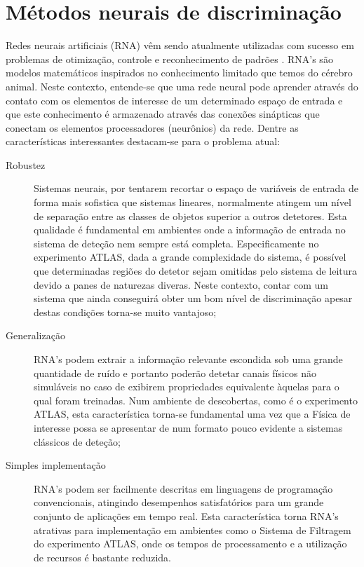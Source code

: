 \section{Métodos neurais de discriminação}
\label{sec:neural}

Redes neurais artificiais (RNA) vêm sendo atualmente utilizadas com sucesso em
problemas de otimização, controle e reconhecimento de padrões
\cite{haykin}. RNA's são modelos matemáticos inspirados no conhecimento
limitado que temos do cérebro animal. Neste contexto, entende-se que uma rede
neural pode aprender através do contato com os elementos de interesse de um
determinado espaço de entrada e que este conhecimento é armazenado através das
conexões sinápticas que conectam os elementos processadores (neurônios) da
rede. Dentre as características interessantes destacam-se para o problema
atual:

\begin{description}
\item[Robustez] Sistemas neurais, por tentarem recortar o espaço de variáveis
de entrada de forma mais sofistica que sistemas lineares, normalmente atingem
um nível de separação entre as classes de objetos superior a outros
detetores. Esta qualidade é fundamental em ambientes onde a informação de
entrada no sistema de deteção nem sempre está completa. Especificamente no
experimento ATLAS, dada a grande complexidade do sistema, é possível que
determinadas regiões do detetor sejam omitidas pelo sistema de leitura devido
a panes de naturezas diveras. Neste contexto, contar com um sistema que ainda
conseguirá obter um bom nível de discriminação apesar destas condições
torna-se muito vantajoso;

\item[Generalização] RNA's podem extrair a informação relevante escondida sob
uma grande quantidade de ruído e portanto poderão detetar canais físicos não
simuláveis no caso de exibirem propriedades equivalente àquelas para o qual
foram treinadas. Num ambiente de descobertas, como é o experimento ATLAS, esta
característica torna-se fundamental uma vez que a Física de interesse possa se
apresentar de num formato pouco evidente a sistemas clássicos de deteção;

\item[Simples implementação] RNA's podem ser facilmente descritas em
linguagens de programação convencionais, atingindo desempenhos satisfatórios
para um grande conjunto de aplicações em tempo real. Esta característica torna
RNA's atrativas para implementação em ambientes como o Sistema de Filtragem do
experimento ATLAS, onde os tempos de processamento e a utilização de recursos
é bastante reduzida.
\end{description}

